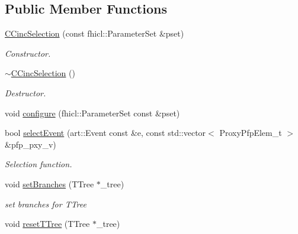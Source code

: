 \subsection*{Public Member Functions}
\begin{DoxyCompactItemize}
\item 
\hyperlink{classselection_1_1CCincSelection_ab8a0d1e95a3db00340396b7bb4075bb0}{C\-Cinc\-Selection} (const fhicl\-::\-Parameter\-Set \&pset)
\begin{DoxyCompactList}\small\item\em Constructor. \end{DoxyCompactList}\item 
\hypertarget{classselection_1_1CCincSelection_a190f4243314f765ca456179437ad6602}{\hyperlink{classselection_1_1CCincSelection_a190f4243314f765ca456179437ad6602}{$\sim$\-C\-Cinc\-Selection} ()}\label{classselection_1_1CCincSelection_a190f4243314f765ca456179437ad6602}

\begin{DoxyCompactList}\small\item\em Destructor. \end{DoxyCompactList}\item 
void \hyperlink{classselection_1_1CCincSelection_a6102d1ccc299153bc168c721028819e1}{configure} (fhicl\-::\-Parameter\-Set const \&pset)
\item 
bool \hyperlink{classselection_1_1CCincSelection_ae8555674551f611dee06dc315ac2987f}{select\-Event} (art\-::\-Event const \&e, const std\-::vector$<$ Proxy\-Pfp\-Elem\-\_\-t $>$ \&pfp\-\_\-pxy\-\_\-v)
\begin{DoxyCompactList}\small\item\em Selection function. \end{DoxyCompactList}\item 
\hypertarget{classselection_1_1CCincSelection_a4ddb77bf23a3d37330aaaac9cbffdfa4}{void \hyperlink{classselection_1_1CCincSelection_a4ddb77bf23a3d37330aaaac9cbffdfa4}{set\-Branches} (T\-Tree $\ast$\-\_\-tree)}\label{classselection_1_1CCincSelection_a4ddb77bf23a3d37330aaaac9cbffdfa4}

\begin{DoxyCompactList}\small\item\em set branches for T\-Tree \end{DoxyCompactList}\item 
\hypertarget{classselection_1_1CCincSelection_adcc5ef83ec6e380db3af8ef55deff0a9}{void \hyperlink{classselection_1_1CCincSelection_adcc5ef83ec6e380db3af8ef55deff0a9}{reset\-T\-Tree} (T\-Tree $\ast$\-\_\-tree)}\label{classselection_1_1CCincSelection_adcc5ef83ec6e380db3af8ef55deff0a9}


\end{DoxyCompactItemize}

